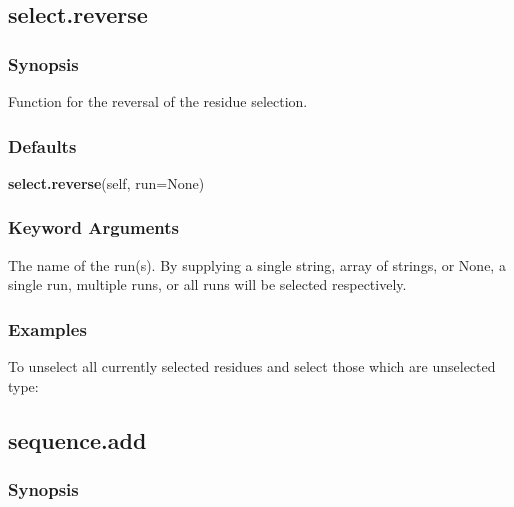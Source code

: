 





\newpage

\subsection{select.reverse}


\subsubsection{Synopsis}

Function for the reversal of the residue selection.

\subsubsection{Defaults}

\textsf{\textbf{select.reverse}(self, run=None)}


\subsubsection{Keyword Arguments}


  The name of the run(s).  By supplying a single string, array of strings, or None, a single run, multiple runs, or all runs will be selected respectively.

\subsubsection{Examples}

To unselect all currently selected residues and select those which are unselected type:




\newpage

\subsection{sequence.add}


\subsubsection{Synopsis}

